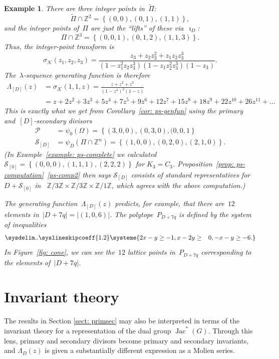 \documentclass{amsart}
\newtheorem{Example}[thm]{Example}
\newenvironment{example}
  {\begin{Example}\rm}{\end{Example}}
\DeclareMathOperator{\Jac}{Jac}
\newcommand{\primary}{\mathcal{P}}
\newcommand{\secondary}{\mathcal{S}}
\newcommand{\Z}{\mathbb{Z}}
\newcommand{\K}{\mathcal{K}}
\begin{document}
\begin{example}
There are three integer points in~$\widetilde{\Pi}$:
\[
  \widetilde{\Pi}\cap\Z^2=\left\{ (0,0),(0,1), (1,1) \right\},
\]
and the integer points of~$\Pi$ are just the ``lifts'' of these via~$\imath_D$:
\[
  \Pi\cap\Z^3=\left\{ (0,0,1),(0,1,2), (1,1,3) \right\}.
\]
Thus, the integer-point transform is
\[
  \sigma_{\K}(z_1,z_2,z_3)
  =\frac{z_3+z_2z_3^2+z_1z_2z_3^3}{(1-z_1^2z_2z_3^3)(1-z_1z_2^2z_3^3)(1-z_3)}.
\]
The~$\lambda$-sequence generating function is therefore
\begin{align*}
  \Lambda_{[D]}(z)&=\sigma_{\K}(1,1,z)=\frac{z+z^2+z^3}{(1-z^3)^2(1-z)}\\[8pt]
  &=z + 2 z^{2} + 3 z^{3} + 5 z^{4} + 7 z^{5} + 9 z^{6} + 12 z^{7} + 15 z^{8} +
  18 z^{9} + 22 z^{10} + 26 z^{11}+\dots
\end{align*}
This is exactly what we get from Corollary~\ref{cor: ps-genfun} using the
primary and~$[D]$-secondary divisors
\begin{align*}
  \primary &= \psi_0(\Omega)=\left\{ (3,0,0),(0,3,0),(0,0,1 \right\}\\
    \secondary_{[D]} &= \psi_D(\Pi\cap\Z^{n})=\left\{ (1,0,0),(0,2,0),(2,1,0)
    \right\}.
\end{align*}
(In Example~\ref{example: ps-complete} we calculated $\secondary_{[0]}=\left\{
(0,0,0),(1,1,1),(2,2,2)\right\}$ for $K_3=C_3$.
Proposition~\ref{prop: ps-computation}~\ref{ps-comp2} then says
$\secondary_{[D]}$ consists of standard representatives
for~$D+\secondary_{[0]}$ in ~$\Z/3\Z\times\Z/3\Z\times\Z/1\Z$, which
agrees with the above computation.) 

The generating function~$\Lambda_{[D]}(z)$ predicts, for example, that there
are~$12$ elements in~$|D+7q|=|(1,0,6)|$.  The polytope~$P_{D+7q}$ is defined by the system of
inequalities
  \begin{equation*}
    \sysdelim..
    \syslineskipcoeff{1.2}
    \systeme{
      2x-y\geq-1,
      x-2y\geq\hphantom{-}0,
      -x-y\geq-6.
    }
  \end{equation*}
In Figure~\ref{fig: cone}, we can see the~$12$ lattice points in~$P_{D+7q}$
corresponding to the elements of~$|D+7q|$.
\end{example}

\section{Invariant theory}\label{sect: molien}
The results in Section \ref{sect: primsec} may also be interpreted in terms of
the invariant theory for a representation of the dual group $\Jac^*(G)$. Through
this lens, primary and secondary divisors become primary and secondary
invariants, and $\Lambda_{D}(z)$ is given a substantially different expression
as a Molien series. 
\end{document}
